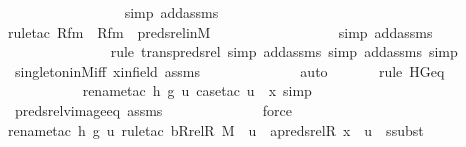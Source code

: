 \begin{isabellebody}
\ \ \ \ \ \ \ \ \ \ \ \ \ \ \ \ \isamarkupfalse%
{\isacharparenleft}{\kern0pt}simp\ add{\isacharcolon}{\kern0pt}assms{\isacharparenright}{\kern0pt}\isanewline
\ \ \ \ \ \ \ \ \ \ \ \ \ \ \ \isamarkupfalse%
{\isacharparenleft}{\kern0pt}rule{\isacharunderscore}{\kern0pt}tac\ Rfm\ {\isacharequal}{\kern0pt}\ Rfm\ \ preds{\isacharunderscore}{\kern0pt}rel{\isacharunderscore}{\kern0pt}in{\isacharunderscore}{\kern0pt}M{\isacharparenright}{\kern0pt}\isanewline
\ \ \ \ \ \ \ \ \ \ \ \ \ \ \ \ \ \isamarkupfalse%
{\isacharparenleft}{\kern0pt}simp\ add{\isacharcolon}{\kern0pt}assms{\isacharparenright}{\kern0pt}{\isacharplus}{\kern0pt}\isanewline
\ \ \ \ \ \ \ \ \ \ \ \ \ \ \isamarkupfalse%
{\isacharparenleft}{\kern0pt}rule\ trans{\isacharunderscore}{\kern0pt}preds{\isacharunderscore}{\kern0pt}rel{\isacharcomma}{\kern0pt}\ simp\ add{\isacharcolon}{\kern0pt}assms{\isacharcomma}{\kern0pt}\ simp\ add{\isacharcolon}{\kern0pt}assms{\isacharcomma}{\kern0pt}\ simp{\isacharparenright}{\kern0pt}\isanewline
\ \ \ \ \ \ \isamarkupfalse%
\ singleton{\isacharunderscore}{\kern0pt}in{\isacharunderscore}{\kern0pt}M{\isacharunderscore}{\kern0pt}iff\ xinfield\ assms\isanewline
\ \ \ \ \ \ \ \ \ \ \ \ \isamarkupfalse%
\ auto{\isacharbrackleft}{\kern0pt}{}{\isacharbrackright}{\kern0pt}\isanewline
\ \ \ \ \ \ \isamarkupfalse%
{\isacharparenleft}{\kern0pt}rule\ HGeq{\isacharparenright}{\kern0pt}\isanewline
\ \ \ \ \ \ \ \ \ \ \isamarkupfalse%
{\isacharparenleft}{\kern0pt}rename{\isacharunderscore}{\kern0pt}tac\ h\ g\ u{\isacharcomma}{\kern0pt}\ case{\isacharunderscore}{\kern0pt}tac\ {\isachardoublequoteopen}u\ {\isacharequal}{\kern0pt}\ x{\isachardoublequoteclose}{\isacharcomma}{\kern0pt}\ simp{\isacharparenright}{\kern0pt}\isanewline
\ \ \ \ \ \ \isamarkupfalse%
\ preds{\isacharunderscore}{\kern0pt}rel{\isacharunderscore}{\kern0pt}vimage{\isacharunderscore}{\kern0pt}eq{\isacharprime}{\kern0pt}\ assms\ \isanewline
\ \ \ \ \ \ \ \ \ \ \ \isamarkupfalse%
\ force\isanewline
\ \ \ \ \ \ \ \ \ \ \isamarkupfalse%
{\isacharparenleft}{\kern0pt}rename{\isacharunderscore}{\kern0pt}tac\ h\ g\ u{\isacharcomma}{\kern0pt}\ rule{\isacharunderscore}{\kern0pt}tac\ b{\isacharequal}{\kern0pt}{\isachardoublequoteopen}Rrel{\isacharparenleft}{\kern0pt}R{\isacharcomma}{\kern0pt}\ M{\isacharparenright}{\kern0pt}\ {\isacharminus}{\kern0pt}{\isacharbackquote}{\kern0pt}{\isacharbackquote}{\kern0pt}\ {\isacharbraceleft}{\kern0pt}u{\isacharbraceright}{\kern0pt}{\isachardoublequoteclose}\ \ a{\isacharequal}{\kern0pt}{\isachardoublequoteopen}preds{\isacharunderscore}{\kern0pt}rel{\isacharparenleft}{\kern0pt}R{\isacharcomma}{\kern0pt}\ x{\isacharparenright}{\kern0pt}\ {\isacharminus}{\kern0pt}{\isacharbackquote}{\kern0pt}{\isacharbackquote}{\kern0pt}\ {\isacharbraceleft}{\kern0pt}u{\isacharbraceright}{\kern0pt}{\isachardoublequoteclose}\ \ ssubst{\isacharparenright}{\kern0pt}\isanewline

\end{isabellebody}
